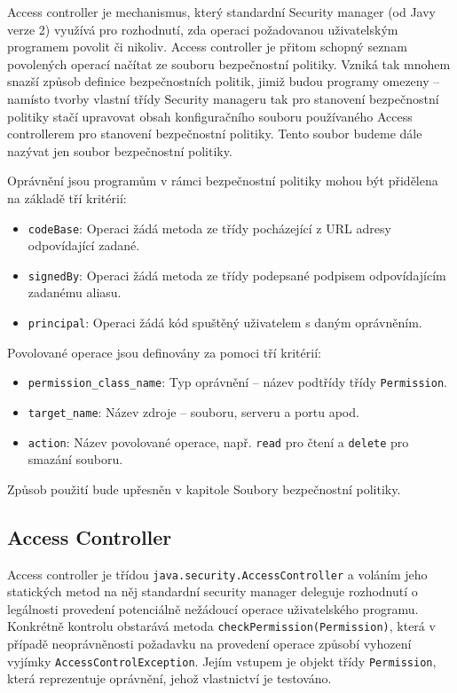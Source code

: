 Access controller je mechanismus, který standardní Security manager (od Javy verze 2) využívá pro rozhodnutí, zda operaci požadovanou uživatelským programem povolit či nikoliv. Access controller je přitom schopný seznam povolených operací načítat ze souboru bezpečnostní politiky. Vzniká tak mnohem snazší způsob definice bezpečnostních politik, jimiž budou programy omezeny -- namísto tvorby vlastní třídy Security manageru tak pro stanovení bezpečnostní politiky stačí upravovat obsah konfiguračního souboru používaného Access controllerem pro stanovení bezpečnostní politiky. Tento soubor budeme dále nazývat jen soubor bezpečnostní politiky. \cite[5]{oaks}

Oprávnění jsou programům v rámci bezpečnostní politiky mohou být přidělena na základě tří kritérií: \cite{refPolicyFiles}

\begin{itemize}
  \item {\tt codeBase}: Operaci žádá metoda ze třídy pocházející z URL adresy odpovídající zadané.
  \item {\tt signedBy}: Operaci žádá metoda ze třídy podepsané podpisem odpovídajícím zadanému aliasu.
  \item {\tt principal}: Operaci žádá kód spuštěný uživatelem s daným oprávněním.
\end{itemize}

Povolované operace jsou definovány za pomoci tří kritérií: \cite{jdkdocPolicyFiles}

\begin{itemize}
  \item {\tt permission\_class\_name}: Typ oprávnění -- název podtřídy třídy {\tt Permission}.
  \item {\tt target\_name}: Název zdroje -- souboru, serveru a portu apod.
  \item {\tt action}: Název povolované operace, např. {\tt read} pro čtení a {\tt delete} pro smazání souboru.
\end{itemize}

Způsob použití bude upřesněn v kapitole Soubory bezpečnostní politiky.

\subsection{Access Controller}

Access controller je třídou {\tt java.security.AccessController} a voláním jeho statických metod na něj standardní security manager deleguje rozhodnutí o legálnosti provedení potenciálně nežádoucí operace uživatelského programu. Konkrétně kontrolu obstarává metoda {\tt checkPermission(Permission)}, která v případě neoprávněnosti požadavku na provedení operace způsobí vyhození vyjímky {\tt AccessControlException}. Jejím vstupem je objekt třídy {\tt Permission}, která reprezentuje oprávnění, jehož vlastnictví je testováno. \cite[5.5]{oaks}

